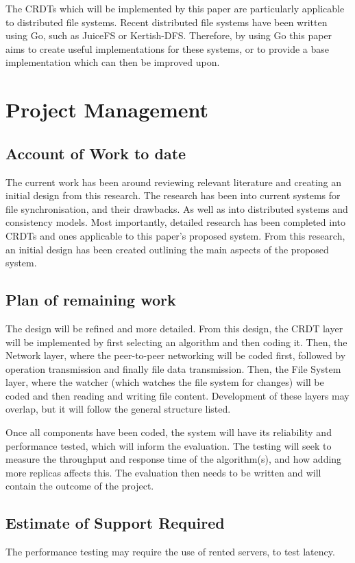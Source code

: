 \documentclass[12pt]{article}
\begin{document}
The CRDTs which will be implemented by this paper are particularly applicable to distributed file systems. Recent distributed file systems have been written using Go, such as JuiceFS or Kertish-DFS. Therefore, by using Go this paper aims to create useful implementations for these systems, or to provide a base implementation which can then be improved upon. \par

\section{Project Management}

\subsection{Account of Work to date}
The current work has been around reviewing relevant literature and creating an initial design from this research. The research has been into current systems for file synchronisation, and their drawbacks. As well as into distributed systems and consistency models. Most importantly, detailed research has been completed into CRDTs and ones applicable to this paper's proposed system. From this research, an initial design has been created outlining the main aspects of the proposed system.

\subsection{Plan of remaining work}
The design will be refined and more detailed. From this design, the CRDT layer will be implemented by first selecting an algorithm and then coding it. Then, the Network layer, where the peer-to-peer networking will be coded first, followed by operation transmission and finally file data transmission. Then, the File System layer, where the watcher (which watches the file system for changes) will be coded and then reading and writing file content. Development of these layers may overlap, but it will follow the general structure listed. \par
Once all components have been coded, the system will have its reliability and performance tested, which will inform the evaluation. The testing will seek to measure the throughput and response time of the algorithm(s), and how adding more replicas affects this. The evaluation then needs to be written and will contain the outcome of the project.

\subsection{Estimate of Support Required}
The performance testing may require the use of rented servers, to test latency.
\end{document}
